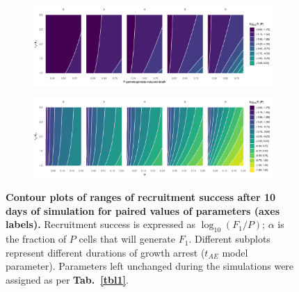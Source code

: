 \documentclass[a4paper,oneside]{article}
\begin{document}
    \begin{figure}[p]
      \centering
      \begin{subfigure}{\textwidth}
        \includegraphics[width=\linewidth]{imgs/a.pdf}
      \end{subfigure}

      \begin{subfigure}{\textwidth}
        \includegraphics[width=\linewidth]{imgs/b.pdf}
      \end{subfigure}
      \caption{\textbf{Contour plots of ranges of recruitment success after 10 days of simulation for paired values of parameters (axes labels).}
        Recruitment success is expressed as $\log_{10}(F_{1}/P)$; $\alpha$ is the fraction of $P$ cells that will generate $F_{1}$.
        Different subplots represent different durations of growth arrest ($t_{AE}$ model parameter).
        Parameters left unchanged during the simulations were assigned as per \textbf{Tab.~\ref{tbl1}}.
      }\label{swep}
    \end{figure}
\end{document}
